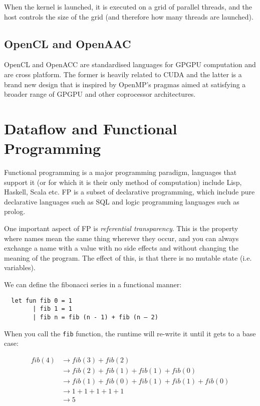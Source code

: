 When the kernel is launched, it is executed on a grid of parallel
threads, and the host controls the size of the grid (and therefore how
many threads are launched).

\subsection{OpenCL and OpenAAC}

OpenCL and OpenACC are standardised languages for GPGPU computation
and are cross platform. The former is heavily related to CUDA and the
latter is a brand new design that is inspired by OpenMP's pragmas
aimed at satisfying a broader range of GPGPU and other coprocessor
architectures.


\section{Dataflow and Functional Programming}

Functional programming is a major programming paradigm, languages that
support it (or for which it is their only method of computation)
include Lisp, Haskell, Scala etc. FP is a subset of declarative
programming, which include pure declarative languages such as SQL and
logic programming languages such as prolog.

One important aspect of FP is \textit{referential transparency}. This
is the property where names mean the same thing wherever they occur,
and you can always exchange a name with a value with no side effects
and without changing the meaning of the program. The effect of this,
is that there is no mutable state (i.e. variables).

We can define the fibonacci series in a functional manner:

\begin{verbatim}
  let fun fib 0 = 1
        | fib 1 = 1
        | fib n = fib (n - 1) + fib (n – 2)
\end{verbatim}

When you call the \texttt{fib} function, the runtime will re-write it
until it gets to a base case:

\[
\begin{split}
  fib(4) &\rightarrow fib(3) + fib(2)\\
         &\rightarrow fib(2) + fib(1) + fib(1) + fib(0)\\
         &\rightarrow fib(1) + fib(0) + fib(1) + fib(1) + fib(0)\\
         &\rightarrow 1 + 1 + 1 + 1 + 1\\
         &\rightarrow 5
\end{split}
\]


